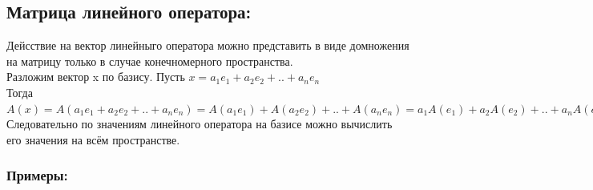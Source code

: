\documentclass[12pt]{article}
\begin{document}
\subsection{Матрица линейного оператора:}
Дейсствие на вектор линейныго оператора можно представить в виде домножения на матрицу только в случае конечномерного пространства.\\
Разложим вектор x по базису. Пусть $x=a_1 e_1+a_2 e_2+..+a_n e_n$\\
Тогда $A(x)=A(a_1 e_1+ a_2 e_2+..+a_n e_n)=A(a_1 e_1)+A(a_2 e_2)+..+A(a_n e_n)=a_1 A(e_1)+a_2 A(e_2)+..+a_n A(e_n)$\\
Следовательно по значениям линейного оператора на базисе можно вычислить его значения на всём пространстве.
\subsubsection{Примеры:}
\end{document}
